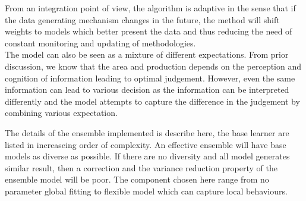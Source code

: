 \documentclass[nojss]{jss}\usepackage[]{graphicx}\usepackage[]{color}
\begin{document}
From an integration point of view, the algorithm is adaptive in the
sense that if the data generating mechanism changes in the future, the
method will shift weights to models which better present the data and
thus reducing the need of constant monitoring and updating of
methodologies.\\

The model can also be seen as a mixture of different
expectations. From prior discussion, we know that the area and
production depends on the perception and cognition of information
leading to optimal judgement. However, even the same information can
lead to various decision as the information can be interpreted
differently and the model attempts to capture the difference in the
judgement by combining various expectation.\\



\FloatBarrier


The details of the ensemble implemented is describe here, the base
learner are listed in increaseing order of complexity. An effective
ensemble will have base models as diverse as possible. If there are no
diversity and all model generates similar result, then a correction
and the variance reduction property of the ensemble model will be
poor. The component chosen here range from no parameter global fitting
to flexible model which can capture local behaviours.\\
\end{document}
